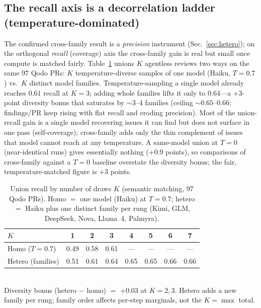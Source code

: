 \subsection{The recall axis is a decorrelation ladder (temperature-dominated)}
\label{sec:ladder}
The confirmed cross-family result is a \emph{precision} instrument
(Sec.~\ref{sec:hetero}); on the orthogonal \emph{recall} (coverage) axis the
cross-family gain is real but small once compute is matched fairly.
Table~\ref{tab:ladder} unions $K$ agentless reviews two ways on the same 97
Qodo PRs: $K$ temperature-diverse samples of one model (Haiku, $T{=}0.7$) vs.\
$K$ distinct model families. Temperature-sampling a single model already
reaches $0.61$ recall at $K{=}3$; adding whole families lifts it only to
$0.64$---a ${+}3$-point diversity bonus that saturates by $\sim$3--4 families
(ceiling $\sim0.65$--$0.66$; findings/PR keep rising with flat recall and
eroding precision). Most of the union-recall gain is a single model recovering
issues it can find but does not surface in one pass (self-coverage);
cross-family adds only the thin complement of issues that model cannot reach at
any temperature. A same-model union at $T{=}0$ (near-identical runs) gives
essentially nothing (${+}0.9$ points), so comparisons of cross-family against a
$T{=}0$ baseline overstate the diversity bonus; the fair, temperature-matched
figure is ${+}3$ points.

\begin{table}[t]
\caption{Union recall by number of draws $K$ (semantic matching, 97 Qodo PRs).
Homo $=$ one model (Haiku) at $T{=}0.7$; hetero $=$ Haiku plus one distinct
family per rung (Kimi, GLM, DeepSeek, Nova, Llama~4, Palmyra).}
\label{tab:ladder}
\centering
\begin{tabular}{lccccccc}
\toprule
$K$ & 1 & 2 & 3 & 4 & 5 & 6 & 7 \\
\midrule
Homo ($T{=}0.7$) & 0.49 & 0.58 & 0.61 & --- & --- & --- & --- \\
Hetero (families) & 0.51 & 0.61 & 0.64 & 0.65 & 0.65 & 0.66 & 0.66 \\
\bottomrule
\end{tabular}
\\[2pt]{\footnotesize Diversity bonus (hetero $-$ homo) $=$ ${+}0.03$ at
$K{=}2,3$. Hetero adds a new family per rung; family order affects per-step
marginals, not the $K{=}\max$ total.}
\end{table}


